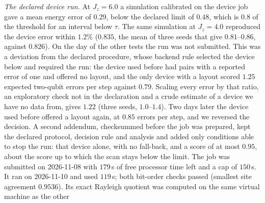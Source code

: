 \documentclass[aps,prx,onecolumn,10pt,nofootinbib,longbibliography,floatfix]{revtex4-2}
\theoremstyle{remark}
\newcommand{\Jz}{J_z}
\begin{document}
\emph{The declared device run.} At $\Jz=6.0$ a simulation calibrated on the device job gave a mean energy error of $0.29$, %
below the declared limit of $0.48$, which is $0.8$ of the threshold for an interval below $\tau$. The same simulation at %
$\Jz=4.0$ reproduced the device error within $1.2\%$ ($0.835$, the mean of three seeds that give $0.81$--$0.86$, %
against $0.826$). On the day of the other tests the run %
was not submitted. This was a deviation from the declared procedure, whose backend rule selected the device below and
required the run: the device used before had pairs with a reported error of one and offered no layout, and the only
device with a layout scored $1.25$ expected two-qubit errors per step against $0.79$. Scaling every error by that ratio, %
an exploratory check not in the declaration and a crude estimate of a device we have no data from, gives $1.22$ %
(three seeds, $1.0$--$1.4$). Two %
days later the device used before offered a layout again, at $0.85$ errors per step, and we reversed the decision. A %
second addendum, checksummed before the job was prepared, kept the declared protocol, decision rule and analysis and
added only conditions able to stop the run: that device alone, with no fall-back, and a score of at most $0.95$, about %
the score up to which the scan stays below the limit. The job was submitted on 2026-11-08 with $179$\,s of free %
processor time left and a cap of $150$\,s. It ran on 2026-11-10 and used $119$\,s; both bit-order checks passed %
(smallest site agreement $0.9536$). Its exact Rayleigh quotient was computed on the same virtual machine as the other %
\end{document}
